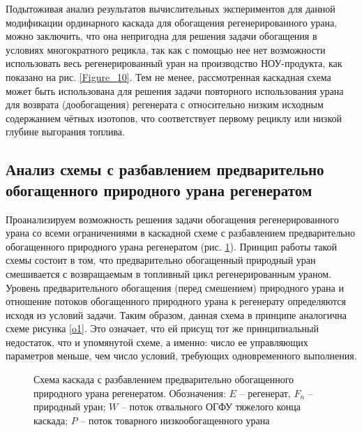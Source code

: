 Подытоживая анализ результатов вычислительных экспериментов для данной модификации ординарного каскада для обогащения регенерированного урана, можно заключить, что она непригодна для решения задачи обогащения в условиях многократного рецикла, так как с помощью нее нет возможности использовать весь регенерированный уран на производство НОУ-продукта, как показано на рис. \ref{Figure_10}. Тем не менее, рассмотренная каскадная схема может быть использована для решения задачи повторного использования урана для возврата (дообогащения) регенерата с относительно низким исходным содержанием чётных изотопов, что соответствует первому рециклу или низкой глубине выгорания топлива.

\subsection{Анализ схемы с разбавлением предварительно обогащенного природного урана регенератом}

Проанализируем возможность решения задачи обогащения регенерированного урана со всеми ограничениями в каскадной схеме с разбавлением предварительно обогащенного природного урана регенератом (рис. \ref{o2}). Принцип работы такой схемы состоит в том, что предварительно обогащенный природный уран смешивается с возвращаемым в топливный цикл регенерированным ураном. Уровень предварительного обогащения (перед смешением) природного урана и отношение потоков обогащенного природного урана к регенерату определяются исходя из условий задачи. Таким образом, данная схема в принципе аналогична схеме рисунка \ref{o1}. Это означает, что ей присущ тот же принципиальный недостаток, что и упомянутой схеме, а именно: число ее управляющих параметров меньше, чем число условий, требующих одновременного выполнения. 

\begin{figure}[ht]
  \caption{Схема каскада с разбавлением предварительно обогащенного природного урана регенератом. Обозначения: $E$ -- регенерат, $F_n$ -- природный уран; $W$ -- поток отвального ОГФУ тяжелого конца каскада; $P$ -- поток товарного низкообогащенного урана}\label{o2}
\end{figure}

